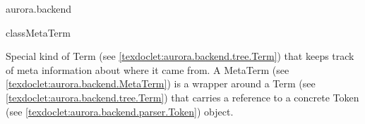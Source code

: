 \begin{texdocpackage}{aurora.backend}
\begin{texdocclass}{class}{MetaTerm}
\label{texdoclet:aurora.backend.MetaTerm}
\begin{texdocclassintro}
Special kind of Term (see \ref{texdoclet:aurora.backend.tree.Term}) that keeps track of meta information about where it came from.
 A MetaTerm (see \ref{texdoclet:aurora.backend.MetaTerm}) is a wrapper around a Term (see \ref{texdoclet:aurora.backend.tree.Term}) that carries a reference to a concrete Token (see \ref{texdoclet:aurora.backend.parser.Token}) object.\end{texdocclassintro}
\begin{texdocclassfields}
\end{texdocclassfields}
\begin{texdocclassconstructors}
\end{texdocclassconstructors}
\begin{texdocclassmethods}
\end{texdocclassmethods}
\end{texdocclass}



\end{texdocpackage}
